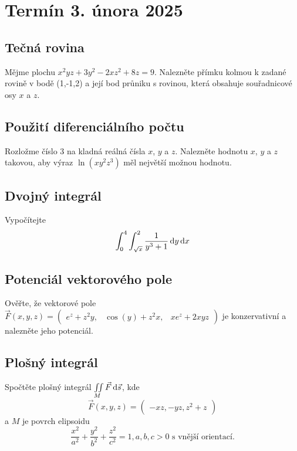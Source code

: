 \section{Termín 3. února 2025}

\subsection{Tečná rovina}
Mějme plochu $x^2yz + 3y^2 - 2xz^2 + 8z = 9$.
Nalezněte přímku kolmou k zadané rovině v bodě (1,-1,2) a její bod průniku s rovinou, která obsahuje souřadnicové osy 
$x$ a $z$.

\subsection{Použití diferenciálního počtu}

Rozložme číslo 3 na kladná reálná čísla $x$, $y$ a $z$. Nalezněte hodnotu $x$, $y$ a $z$ takovou, aby výraz $\ln(x y^2 z^3)$ měl největší 
možnou hodnotu.

\subsection{Dvojný integrál}
Vypočítejte
\[
    \int_{0}^{4} \int_{\sqrt{x}}^{2} \frac{1}{y^3 + 1} \mathop{}\!\mathrm{d} y \mathop{}\!\mathrm{d} x
\]

\subsection{Potenciál vektorového pole}
Ověřte, že vektorové pole 
$\vec{F}(x, y, z) =
\begin{pmatrix}
    e^z + z^2 y, & \cos(y) + z^2 x, & xe^z + 2xyz
\end{pmatrix}$ je konzervativní a nalezněte jeho potenciál.

\subsection{Plošný integrál}
Spočtěte plošný integrál $\iint\limits_{M} \vec{F} \mathop{}\!\mathrm{d} \vec{s}$, kde 
\[\vec{F}(x,y,z) = 
    \begin{pmatrix}
        -xz, -yz, z^2 + z
    \end{pmatrix}
\] 
a $M$ je povrch elipsoidu 
\[
    \frac{x^2}{a^2} + \frac{y^2}{b^2} + \frac{z^2}{c^2} =1, a,b,c > 0 \text{ s vnější orientací.}
\]